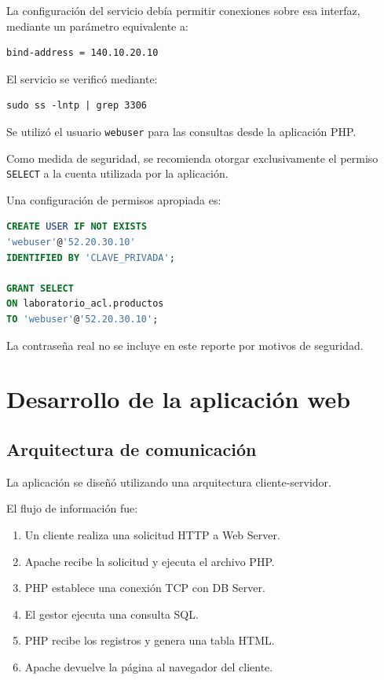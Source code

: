 \documentclass[12pt,a4paper]{article}
\begin{document}
La configuración del servicio
debía permitir conexiones sobre
esa interfaz, mediante un parámetro
equivalente a:

\begin{lstlisting}
bind-address = 140.10.20.10
\end{lstlisting}

El servicio se verificó mediante:

\begin{lstlisting}
sudo ss -lntp | grep 3306
\end{lstlisting}

Se utilizó el usuario
\texttt{webuser} para las consultas
desde la aplicación PHP.

Como medida de seguridad,
se recomienda otorgar exclusivamente
el permiso \texttt{SELECT} a la
cuenta utilizada por la aplicación.

Una configuración de permisos
apropiada es:

\begin{lstlisting}[language=SQL]
CREATE USER IF NOT EXISTS
'webuser'@'52.20.30.10'
IDENTIFIED BY 'CLAVE_PRIVADA';

GRANT SELECT
ON laboratorio_acl.productos
TO 'webuser'@'52.20.30.10';
\end{lstlisting}

La contraseña real no se incluye
en este reporte por motivos
de seguridad.

\section{Desarrollo de la aplicación web}

\subsection{Arquitectura de comunicación}

La aplicación se diseñó utilizando
una arquitectura cliente-servidor.

El flujo de información fue:

\begin{enumerate}
    \item Un cliente realiza una
    solicitud HTTP a Web Server.

    \item Apache recibe la solicitud
    y ejecuta el archivo PHP.

    \item PHP establece una conexión
    TCP con DB Server.

    \item El gestor ejecuta una consulta SQL.

    \item PHP recibe los registros
    y genera una tabla HTML.

    \item Apache devuelve la página
    al navegador del cliente.
\end{enumerate}
\end{document}
